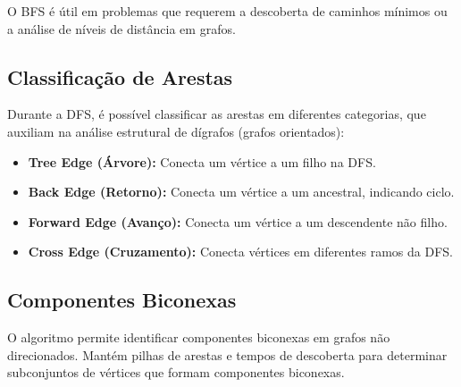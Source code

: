 O BFS é útil em problemas que requerem a descoberta de caminhos mínimos ou a análise de níveis de distância em grafos.

\subsection{Classificação de Arestas}

Durante a DFS, é possível classificar as arestas em diferentes categorias, que auxiliam na análise estrutural de dígrafos (grafos orientados):

\begin{itemize}
    \item \textbf{Tree Edge (Árvore):} Conecta um vértice a um filho na DFS.
    \item \textbf{Back Edge (Retorno):} Conecta um vértice a um ancestral, indicando ciclo.
    \item \textbf{Forward Edge (Avanço):} Conecta um vértice a um descendente não filho.
    \item \textbf{Cross Edge (Cruzamento):} Conecta vértices em diferentes ramos da DFS.
\end{itemize}

\subsection{Componentes Biconexas}

O algoritmo permite identificar componentes biconexas em grafos não direcionados. Mantém pilhas de arestas e tempos de descoberta para determinar subconjuntos de vértices que formam componentes biconexas.

